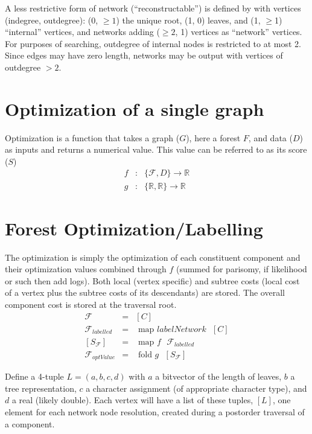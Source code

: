 \documentclass[11pt]{article}
\begin{document}
 A less restrictive form of network (``reconstructable'') is defined by \cite{moretetal2004} with vertices (indegree, outdegree): 
 (0, $\ge 1$) the unique root, (1, 0) leaves, and (1, $\ge$1) ``internal'' vertices, and 
 networks adding ($\ge 2$, 1) vertices as ``network'' vertices.  For purposes of searching,
 outdegree of internal nodes is restricted to at most 2. Since edges may have zero length, networks may be output 
 with vertices of outdegree $> 2$.
 
 \section{Optimization of a single graph}
 Optimization is a function that takes a graph ($G$), here a forest $F$, and data ($D$) as inputs and returns a numerical value.  
 This value can be referred to as its score ($S$)
 	\begin{eqnarray*}
 		f & : &  \{\mathcal{F}, D\} \rightarrow \mathbb{R}\\
		g & : & \{  \mathbb{R},  \mathbb{R} \} \rightarrow \mathbb{R}
	 \end{eqnarray*}
 
 \section{Forest Optimization/Labelling}
 The optimization is simply the optimization of each constituent component and their optimization values 
 combined through $f$ (summed for parisomy, if likelihood or such then add logs).  Both local (vertex  specific) and subtree costs (local cost of a vertex plus
 the subtree costs of its descendants) are stored.  The overall component cost is stored at the traversal root.
     \begin{eqnarray*}
     	\mathcal{F} & = & [C]\\
	\mathcal{F}_{labelled} & = & \text{ map } labelNetwork \text{ } [C]\\
	\left[ S_{\mathcal{F}} \right] &=& \text{ map } f \text{ } \mathcal{F}_{labelled}\\
	\mathcal{F}_{optValue} &=& \text{ fold } g \text{ } \left[ S_{\mathcal{F}} \right] 
    \end{eqnarray*}
 
 Define a 4-tuple $L = (a, b, c, d)$ with $a$ a bitvector of the length of leaves, $b$ a tree representation, $c$ a 
 character assignment (of appropriate character type), and $d$ a real (likely double). Each vertex will have a list of these
 tuples, $\left[L\right]$, one element for each network node resolution, created during a postorder traversal of a component.
 
\end{document}
